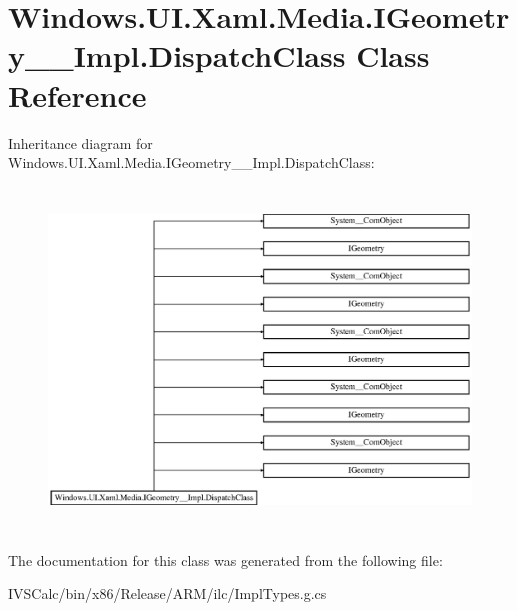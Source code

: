 \hypertarget{class_windows_1_1_u_i_1_1_xaml_1_1_media_1_1_i_geometry_____impl_1_1_dispatch_class}{}\section{Windows.\+U\+I.\+Xaml.\+Media.\+I\+Geometry\+\_\+\+\_\+\+Impl.\+Dispatch\+Class Class Reference}
\label{class_windows_1_1_u_i_1_1_xaml_1_1_media_1_1_i_geometry_____impl_1_1_dispatch_class}
Inheritance diagram for Windows.\+U\+I.\+Xaml.\+Media.\+I\+Geometry\+\_\+\+\_\+\+Impl.\+Dispatch\+Class\+:\begin{figure}[H]
\begin{center}
\leavevmode
\includegraphics[height=9.139465cm]{class_windows_1_1_u_i_1_1_xaml_1_1_media_1_1_i_geometry_____impl_1_1_dispatch_class}
\end{center}
\end{figure}


The documentation for this class was generated from the following file\+:\begin{DoxyCompactItemize}
\item 
I\+V\+S\+Calc/bin/x86/\+Release/\+A\+R\+M/ilc/Impl\+Types.\+g.\+cs\end{DoxyCompactItemize}
